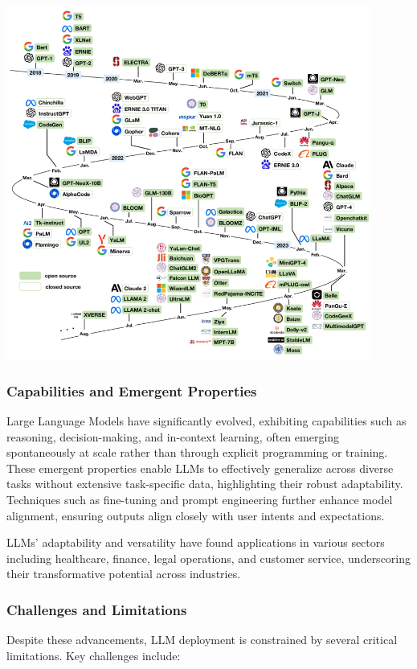 \begin{center}
    \centering
    \includegraphics[width=0.9\textwidth]{Images/evolution chronologic LLM.png}
     \cite{llmEvolution}
    \label{fig:llmEvolution}
\end{center}

\subsubsection{Capabilities and Emergent Properties}
Large Language Models have significantly evolved, exhibiting capabilities such as reasoning, decision-making, and in-context learning, often emerging spontaneously at scale rather than through explicit programming or training. These emergent properties enable LLMs to effectively generalize across diverse tasks without extensive task-specific data, highlighting their robust adaptability. Techniques such as fine-tuning and prompt engineering further enhance model alignment, ensuring outputs align closely with user intents and expectations.\mynewline

LLMs’ adaptability and versatility have found applications in various sectors including healthcare, finance, legal operations, and customer service, underscoring their transformative potential across industries.

\subsubsection{Challenges and Limitations}
Despite these advancements, LLM deployment is constrained by several critical limitations. Key challenges include:

